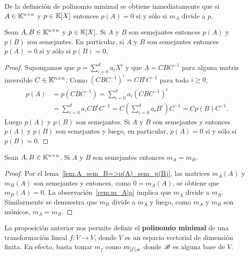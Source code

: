 \begin{remark}
	\label{rem:m_A|p}
    De la definición de polinomio minimal se obtiene inmediatamente que si
    $A\in\mathbb{K}^{n\times n}$ y $p\in\mathbb{K}[X]$ entonces $p(A)=0$ si y sólo si $m_A$
    divide a $p$.
%
\end{remark}

\begin{lem}
	\label{lem:A_sem_B=>p(A)_sem_p(B)}
	Sean $A,B\in\mathbb{K}^{n\times n}$ y $p\in\mathbb{K}[X]$. Si $A$ y $B$ son semejantes
	entonces $p(A)$ y $p(B)$ son semejantes. En particular, si $A$ y $B$ son
	semejantes entonces $p(A)=0$ si y sólo si $p(B)=0$.

	\begin{proof}
		Supongamos que $p=\sum_{i=0}^d a_iX^i$ y que $A=CBC^{-1}$ para alguna
		matriz inversible $C\in\mathbb{K}^{n\times n}$. Como $(CBC^{-1})^i=CB^iC^{-1}$
		para todo $i\geq0$, 
		\begin{align*}
			p(A)&=p(CBC^{-1})=\sum_{i=0}^d a_i(CBC^{-1})^i\\&=\sum_{i=0}^d a_iCB^iC^{-1}
			=C\left(\sum_{i=0}^d a_iB^i\right)C^{-1}=Cp(B)C^{-1}.
		\end{align*}
		Luego $p(A)$ y $p(B)$ son semejantes. Si $A$ y $B$ son semejantes y
		entonces $p(A)$ y $p(B)$ son semejantes y luego, en particular,
		$p(A)=0$ si y sólo si $p(B)=0$. 
	\end{proof}
\end{lem}

\begin{prop}
	Sean $A,B\in\mathbb{K}^{n\times n}$. Si $A$ y $B$ son semejantes entonces $m_A=m_B$.

	\begin{proof}
        Por el lema~\ref{lem:A_sem_B=>p(A)_sem_p(B)}, las matrices $m_A(A)$ y
        $m_B(A)$ son semejantes y entonces, como $0=m_A(A)$, se obtiene que
        $m_B(A)=0$. La observación~\ref{rem:m_A|p} implica que $m_A$ divide a
        $m_B$.  Similarmente se demuestra que $m_B$ divide a $m_A$ y luego,
        como $m_A$ y $m_B$ son mónicos, $m_A=m_B$.
	\end{proof}
\end{prop}

\begin{block}
	La proposición anterior nos permite definir el \textbf{polinomio minimal}
	de una transformación lineal $f\colon V\to V$, donde $V$ es un espacio
	vectorial de dimensión finita. En efecto, basta tomar $m_f$ como
	$m_{[f]_{\mathscr{B}}}$ donde $\mathscr{B}$ es alguna base de $V$.
\end{block}

